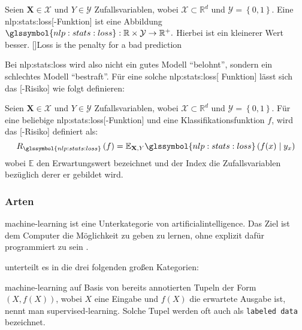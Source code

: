 \begin{defn}
	Seien
	\(\mathbf{X} \in \mathcal{X}\)
	und
	\(Y \in \mathcal{Y}\)
	Zufallsvariablen,
	wobei
	\(\mathcal{X}\subset\mathbb{R}^d\)
	und
	\(\mathcal{Y} = \left\lbrace0,1\right\rbrace\).
	Eine \gls{nlp:stats:loss}[-Funktion]
	ist eine Abbildung
	\(\glssymbol{nlp:stats:loss}: \mathbb{R} \times \mathcal{Y} \to \mathbb{R}^{+}.\)
	Hierbei ist ein kleinerer Wert besser.
	[\autocite{google:trainingandloss}]{Loss is the penalty for a bad prediction}
\end{defn}

Bei \gls{nlp:stats:loss} wird also nicht ein gutes Modell \enquote{belohnt},
sondern ein schlechtes Modell \enquote{bestraft}.
Für eine solche \gls{nlp:stats:loss}[ Funktion] 
lässt sich das [-Risiko]
wie folgt definieren:

\begin{defn}
	Seien
	\(\mathbf{X} \in \mathcal{X}\)
	und
	\(Y \in \mathcal{Y}\)
	Zufallsvariablen,
	wobei
	\(\mathcal{X}\subset\mathbb{R}^d\)
	und
	\(\mathcal{Y} = \left\lbrace0,1\right\rbrace\).
	Für eine beliebige \gls{nlp:stats:loss}[-Funktion] 
	und eine Klassifikationsfunktion \(f\),
	wird das [-Risiko] definiert als:
	\begin{equation}
		\label{eqn:loss-risk}
		R_{\glssymbol{nlp:stats:loss}} \left(f\right)
		=
		\mathbb{E}_{\mathbf{X},Y} \glssymbol{nlp:stats:loss}\left(f(x) \mid y_{x}\right)
	\end{equation}
	wobei \(\mathbb{E}\) den Erwartungswert bezeichnet
	und der Index die Zufallsvariablen bezüglich derer er gebildet wird.
\end{defn}


\subsubsection{Arten }
\Gls{machine-learning} ist eine Unterkategorie von \gls{artificialintelligence}.
Das Ziel ist dem Computer die Möglichkeit zu geben zu lernen,
ohne explizit dafür programmiert zu sein \autocite{levity:howdomachineslearn}.

\citeauthor{levity:howdomachineslearn} unterteilt es in die drei folgenden großen Kategorien:


\begin{defn}
	\Gls{machine-learning}
	auf Basis von bereits annotierten Tupeln der Form
	\(\left(X, f(X)\right)\),
	wobei \(X\) eine Eingabe und \(f(X)\) die erwartete Ausgabe ist,
	nennt man \gls{supervised-learning}.
	Solche Tupel werden oft auch als \texttt{labeled data} bezeichnet.
\end{defn}

